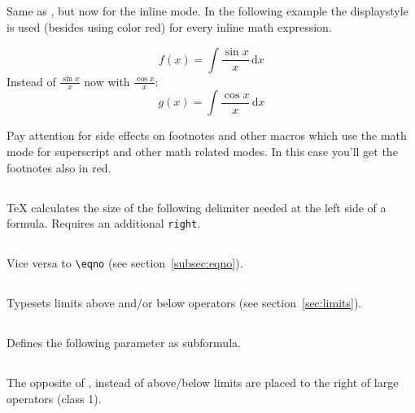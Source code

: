 \begin{table}[htb]
\subsection{}
Same as , but now for the inline mode. 
In the following example
the displaystyle is used (besides using color red) for every inline math expression.

\bgroup
\begin{LTXexample}[width=0.45\linewidth]
\everymath{\color{red}%
  \displaystyle}
\[ f(x) = \int \frac{\sin x}{x}\,\mathrm{d}x \]
Instead of $\frac{\sin x}{x}$ 
  now with $\frac{\cos x}{x}$:
\[ g(x) = \int \frac{\cos x}{x}\,\mathrm{d}x \]
\end{LTXexample}
\egroup

Pay attention for side effects on footnotes and other macros which use the math mode for superscript
and other math related modes. In this case you'll get the footnotes also in red.

\subsection{}
\TeX{} calculates the size of the following delimiter needed at the left side of a formula.
Requires an additional \verb+right+.

\subsection{}
Vice versa to \verb+\eqno+ (see section~\vref{subsec:eqno}).

\subsection{}
Typesets limits above and/or below operators (see section~\vref{sec:limits}).

\subsection{}
Defines the following parameter as subformula.

\subsection{}
The opposite of , instead of above/below limits are placed to the right of large 
operators (class 1).



\end{table}
